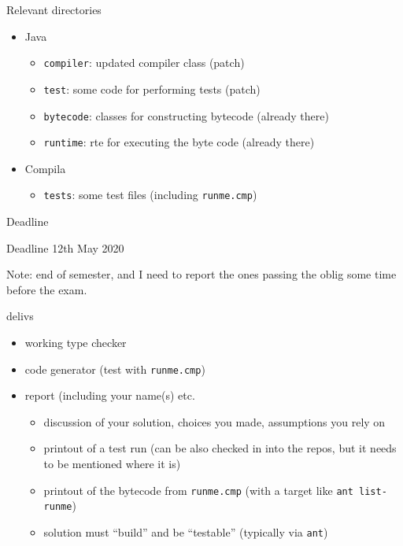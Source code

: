 \documentclass{beamer}
\begin{document}
\begin{frame}[label={sec:orgb706e2a},fragile]{Relevant directories}
 \begin{itemize}
\item Java

\begin{itemize}
\item \texttt{compiler}: updated compiler class (patch)
\item \texttt{test}:   some code for performing tests (patch)
\item \texttt{bytecode}: classes for constructing bytecode (already there)
\item \texttt{runtime}: rte for executing the byte code (already there)
\end{itemize}

\item Compila

\begin{itemize}
\item \texttt{tests}: some test files (including \texttt{runme.cmp})
\end{itemize}
\end{itemize}
\end{frame}



\begin{frame}[label={sec:org4811e13},fragile]{Deadline}
 \begin{alertblock}{Deadline}
12th May 2020
\end{alertblock}



Note: end of semester, and I need to report the ones passing the oblig some
time before the exam.


\begin{block}{delivs}
\begin{itemize}
\item working type checker
\item code generator (test with \texttt{runme.cmp})
\item report (including your name(s) etc.

\begin{itemize}
\item discussion of your solution, choices you made, assumptions you rely on

\item printout of a test run (can be also checked in into the repos, but it 
needs to be mentioned where it is)
\item printout of the bytecode from \texttt{runme.cmp} (with a target like \texttt{ant
    list-runme})

\item solution must ``build'' and be ``testable'' (typically via \texttt{ant})
\end{itemize}
\end{itemize}
\end{block}
\end{frame}







\end{document}
